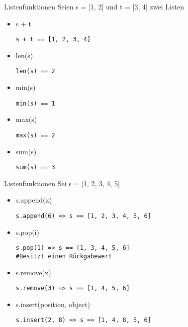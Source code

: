 \begin{frame}[fragile]{Listenfunktionen}
Seien s = [1, 2] und t = [3, 4] zwei Listen
\begin{itemize}
\item s + t 
\begin{lstlisting}
s + t == [1, 2, 3, 4]
\end{lstlisting}
\item len(s) 
\begin{lstlisting}
len(s) == 2
\end{lstlisting}
\item min(s)
\begin{lstlisting}
min(s) == 1
\end{lstlisting}
\item max(s) 
\begin{lstlisting}
max(s) == 2
\end{lstlisting}
\item sum(s) 
\begin{lstlisting}
sum(s) == 3
\end{lstlisting}
\end{itemize}
\end{frame}

\begin{frame}[fragile]{Listenfunktionen}
Sei s = [1, 2, 3, 4, 5]
\begin{itemize}
\item s.append(x)
\begin{lstlisting}
s.append(6) => s == [1, 2, 3, 4, 5, 6]
\end{lstlisting}
\item s.pop(i)
\begin{lstlisting}
s.pop(1) => s == [1, 3, 4, 5, 6] 
#Besitzt einen Rückgabewert
\end{lstlisting}
\item s.remove(x)
\begin{lstlisting}
s.remove(3) => s == [1, 4, 5, 6]
\end{lstlisting}
\item s.insert(position, object)
\begin{lstlisting}
s.insert(2, 8) => s == [1, 4, 8, 5, 6]
\end{lstlisting}
\end{itemize}
\end{frame}


